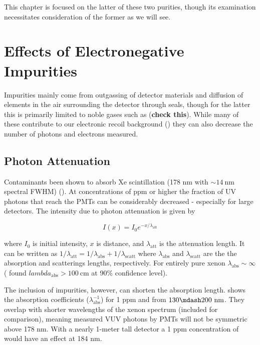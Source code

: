 This chapter is focused on the latter of these two purities, though its examination necessitates consideration of the former as we will
see.



\section{Effects of Electronegative Impurities}
\label{sec:importance_procedure_effects}
Impurities mainly come from outgassing of detector materials and diffusion of elements in the air surrounding the detector through seals,
though for the latter this is primarily limited to noble gases such as  (\textbf{check this}).  While many of these
contribute to our electronic recoil background () they can also decrease the number of photons and
electrons measured.

\subsection{Photon Attenuation}
\label{subsec:importance_procedure_effects_photons}
Contaminants been shown to absorb Xe scintillation (178 nm with ${\sim} 14\ \mathrm{nm}$ spectral FWHM)
().  At concentrations of ppm or higher
the fraction of UV photons that reach the PMTs can be considerably decreased - especially for large detectors.  The intensity due to
photon attenuation is given by

\begin{equation}
I(x) = I_0 e^{-x / \lambda_{\mathrm{att}}}
\end{equation}

\noindent where $I_0$ is initial intensity, $x$ is distance, and $\lambda_{\mathrm{att}}$ is the attenuation length.  It can be written
as $1 / \lambda_{\mathrm{att}} = 1 / \lambda_{\mathrm{abs}} + 1 / \lambda_{\mathrm{scatt}}$ where $\lambda_{\mathrm{abs}}$ and
$\lambda_{\mathrm{scatt}}$ are the the absorption and scatterings lengths, respectively.  For entirely pure xenon
$\lambda_{\mathrm{abs}} \sim \infty$ ( found $lambda_{\mathrm{abs}} > 100\ \mathrm{cm}$ at 90\% confidence
level).

The inclusion of impurities, however, can shorten the absorption
length.   shows the absorption coefficients
($\lambda_{\mathrm{abs}}^{-1}$) for 1 ppm \htwoo and \otwo from $130 \mdash 200\ \mathrm{nm}$.  They overlap with shorter wavelengths
of the xenon spectrum (included for comparison), meaning measured VUV photons by PMTs will not be symmetric above 178 nm.  With a nearly
1-meter tall detector a 1 ppm concentration of \htwoo would have an effect at 184 nm.

